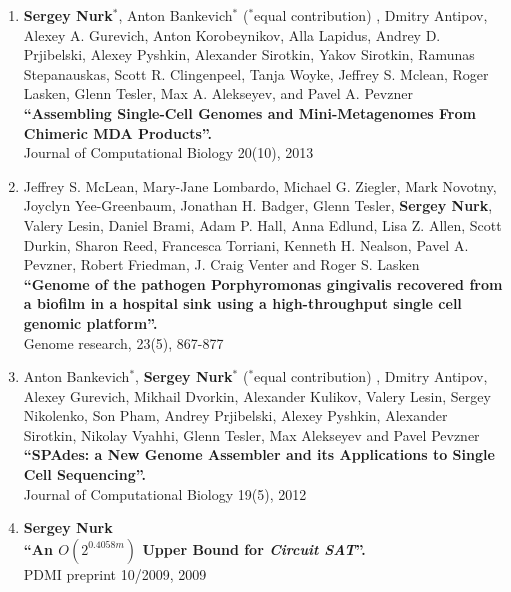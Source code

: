\begin{enumerate}
\item \textbf{Sergey Nurk}$^*$, Anton Bankevich$^*$ ($^*$equal contribution)%
, Dmitry Antipov, Alexey A. Gurevich, Anton Korobeynikov, Alla Lapidus, Andrey D. Prjibelski, Alexey Pyshkin, Alexander Sirotkin, Yakov Sirotkin, Ramunas Stepanauskas, Scott R. Clingenpeel, Tanja Woyke, Jeffrey S. Mclean, Roger Lasken, Glenn Tesler, Max A. Alekseyev, and Pavel A. Pevzner \\
\textbf{``Assembling Single-Cell Genomes and Mini-Metagenomes From Chimeric MDA Products''.} \\
Journal of Computational Biology 20(10), 2013


\item Jeffrey S. McLean, Mary-Jane Lombardo, Michael G. Ziegler, Mark Novotny, Joyclyn Yee-Greenbaum, Jonathan H. Badger, Glenn Tesler, \textbf{Sergey Nurk}, Valery Lesin, Daniel Brami, Adam P. Hall, Anna Edlund, Lisa Z. Allen, Scott Durkin, Sharon Reed, Francesca Torriani, Kenneth H. Nealson, Pavel A. Pevzner, Robert Friedman, J. Craig Venter and Roger S. Lasken \\
\textbf{``Genome of the pathogen Porphyromonas gingivalis recovered from a biofilm in a hospital sink using a high-throughput single cell genomic platform''.} \\
Genome research, 23(5), 867-877

\item Anton Bankevich$^*$, \textbf{Sergey Nurk}$^*$ ($^*$equal contribution)%
, Dmitry Antipov, Alexey Gurevich, Mikhail Dvorkin, Alexander Kulikov, Valery Lesin, Sergey Nikolenko, Son Pham, Andrey Prjibelski, Alexey Pyshkin, Alexander Sirotkin, Nikolay Vyahhi, Glenn Tesler, Max Alekseyev and Pavel Pevzner \\
\textbf{``SPAdes: a New Genome Assembler and its Applications to Single Cell Sequencing''.}\\
Journal of Computational Biology 19(5), 2012

\item \textbf{Sergey Nurk} \\
\textbf{``An $O(2^{0.4058m})$ Upper Bound for \textit{Circuit SAT}''.}\\
PDMI preprint 10/2009, 2009
\end{enumerate}

